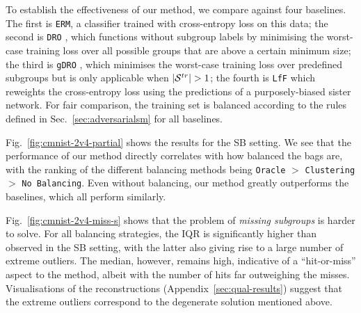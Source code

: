 To establish the effectiveness of our method, we compare against four baselines.
%
The first is \texttt{ERM}, a classifier trained with cross-entropy loss on this data; the second is
\texttt{DRO} \citep{HasSriNamLia18}, which functions without subgroup labels by minimising the
worst-case training loss over all possible groups that are above a certain minimum size; the third
is \texttt{gDRO} \citep{sagawa2019distributionally}, which minimises the worst-case training loss
over predefined subgroups but is only applicable when $|{\mathcal{S}}^{tr}| > 1$; the fourth is \texttt{LfF}
\citep{NamChaAhnLeeetal20} which reweights the cross-entropy loss using the predictions of a
purposely-biased sister network.
%
For fair comparison, the training set is balanced according to the rules defined in
Sec.~\ref{sec:adversarialsm} for all baselines.

Fig.~\ref{fig:cmnist-2v4-partial} shows the results for the SB setting. 
%
We see that the performance of our method directly correlates with how balanced the bags are, with
the ranking of the different balancing methods being \texttt{Oracle} $>$ \texttt{Clustering}$>$
\texttt{No Balancing}. 
%
Even without balancing, our method greatly outperforms the baselines, which all perform similarly.

Fig.~\ref{fig:cmnist-2v4-miss-s} shows that the problem of \emph{missing subgroups} is harder to
solve.
%
For all balancing strategies, the IQR is significantly higher than observed in the SB setting, with
the latter also giving rise to a large number of extreme outliers. 
%
The median, however, remains high, indicative of a ``hit-or-miss'' aspect to the method, albeit
with the number of hits far outweighing the misses. 
%
Visualisations of the reconstructions (Appendix~\ref{sec:qual-results})
suggest that the extreme outliers correspond to the degenerate solution mentioned above.
%


